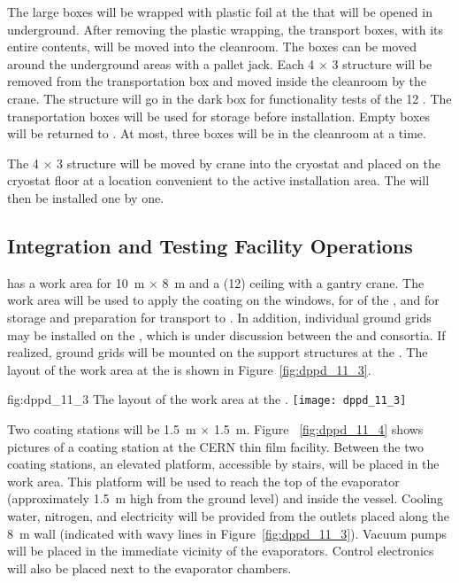The large  boxes will be wrapped with plastic foil at the  that will be opened in  underground. After removing the plastic wrapping, the transport boxes, with its entire contents, will be moved into the cleanroom. The  boxes can be moved around the underground areas with a pallet jack. Each \num{4} $\times$ \num{3} structure will be removed from the transportation box and moved inside the cleanroom by the crane. The structure will go in the dark box for functionality tests of the \num{12} . The transportation boxes will be used for storage before installation. Empty boxes will be returned to . At most, three  boxes will be in the cleanroom at a time.

The \num{4} $\times$ \num{3} structure will be moved by crane into the cryostat and placed on the cryostat floor at a location convenient to the active installation area. The  will then be installed one by one. 

\subsection{Integration and Testing Facility Operations}
\label{subsec:dp-pds-itf}

 has a work area for  \SI{10}{\m} $\times$ \SI{8}{\m} and a (\SI{12}{\ft}) ceiling with a gantry crane. The work area will be used to apply the  coating on the  windows, for  of the , and for storage and preparation for transport to \surf. In addition, individual ground grids may be installed on the , which is under discussion between the  and  consortia. If realized, ground grids will be mounted on the  support structures at the . The layout of the  work area at the  is shown in Figure~\ref{fig:dppd_11_3}.

\begin{dunefigure}{fig:dppd_11_3}
{The layout of the  work area at the .}
\texttt{[image: dppd\_11\_3]}
\end{dunefigure}

Two coating stations will be \SI{1.5}{\m} $\times$ \SI{1.5}{\m}. Figure ~\ref{fig:dppd_11_4} shows pictures of a  coating station at the CERN thin film facility. Between the two coating stations, an elevated platform, accessible by stairs, will be placed in the   work area. This platform will be used to reach the top of the evaporator (approximately \SI{1.5}{\m} high from the ground level) and inside the vessel. Cooling water, nitrogen, and electricity will be provided from the outlets placed along the \SI{8}{\m} wall (indicated with wavy lines in Figure~\ref{fig:dppd_11_3}). Vacuum pumps will be placed in the immediate vicinity of the evaporators. Control electronics will also be placed next to the evaporator chambers. 

